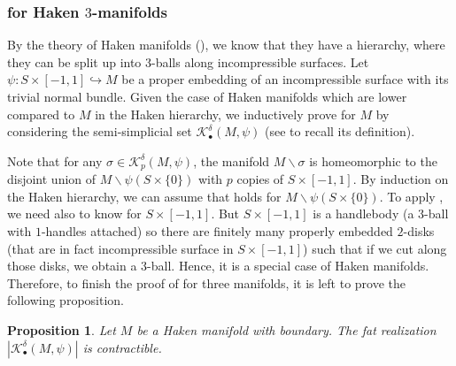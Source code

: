 \documentclass[a4paper]{amsart}
\newtheorem{prop}[thm]{Proposition}
\theoremstyle{definition}
\theoremstyle{remark}
\numberwithin{equation}{section}
\begin{document}
\subsubsection{ for Haken $3$-manifolds}  By the theory of Haken manifolds (\cite{MR0160196}), we know that they have a hierarchy, where they can be split up into 3-balls along incompressible surfaces. Let $\psi:S\times [-1,1]\hookrightarrow M$ be a proper embedding of an incompressible surface with its trivial normal bundle. Given the case of Haken manifolds which are lower compared to $M$ in the Haken hierarchy, we inductively prove  for $M$ by considering the semi-simplicial set $\mathcal{K}^{\delta}_{\bullet}(M,\psi)$ (see  to recall its definition).

 Note that for any $\sigma \in\mathcal{K}^{\delta}_{p}(M,\psi)$, the manifold $M\backslash \sigma$ is homeomorphic to the disjoint union of $M\backslash \psi(S\times\{0\})$ with $p$ copies of $S\times [-1,1]$. By  induction on the Haken hierarchy, we can assume that  holds for  $M\backslash \psi(S\times\{0\})$. To apply , we need also to know  for  $S\times [-1,1]$. But $S\times [-1,1]$ is a handlebody (a $3$-ball with $1$-handles attached) so there are finitely many properly embedded $2$-disks (that are in fact incompressible surface in $S\times [-1,1]$) such that if we cut along those disks, we obtain a $3$-ball. Hence, it is a special case of Haken manifolds. Therefore, to finish the proof of  for three manifolds, it is left to prove the following proposition.
 \begin{prop}\label{cutincomp}
 Let $M$ be a Haken manifold with boundary. The fat realization $|\mathcal{K}^{\delta}_{\bullet}(M,\psi)|$ is contractible.
 \end{prop}  
\end{document}
